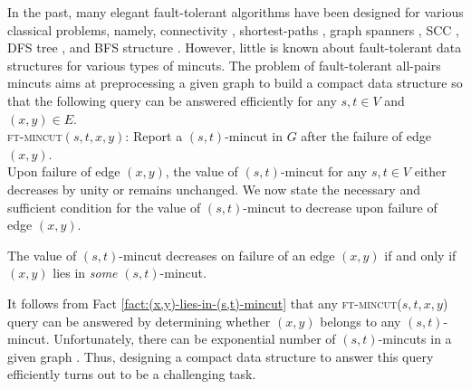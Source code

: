 In the past, many elegant fault-tolerant algorithms have been designed for various classical problems, namely,  connectivity \cite{DBLP:conf/stoc/Chan02,DBLP:journals/algorithmica/FrigioniI00,DBLP:journals/siamcomp/ChanPR11,DBLP:conf/soda/DuanP17}, shortest-paths \cite{DBLP:conf/stoc/BernsteinK09,DBLP:journals/siamcomp/DemetrescuTCR08,DBLP:conf/stoc/ChechikC20}, graph spanners \cite{ChechikLPR10,DBLP:journals/tcs/BraunschvigCPS15}, SCC \cite{DBLP:journals/algorithmica/BaswanaCR19} , DFS tree \cite{DBLP:journals/siamcomp/BaswanaCC019}, and BFS structure \cite{DBLP:journals/talg/ParterP16,DBLP:journals/talg/ParterP18}. However, little is known about fault-tolerant data structures for various types of mincuts. The problem of fault-tolerant all-pairs mincuts aims at preprocessing a given graph to build a compact data structure so that the following query can be answered efficiently for any $s,t\in V$ and $(x,y)\in E$.\\


\noindent
{\textsc{ft-mincut}}$(s,t,x,y)$: Report a $(s,t)$-mincut in $G$ after the failure of edge $(x,y)$.\\


Upon failure of edge $(x,y)$, the value of $(s,t)$-mincut for any $s,t\in V$ either decreases by unity or remains unchanged. We now state the necessary and sufficient condition for the value of $(s,t)$-mincut to decrease upon failure of edge $(x,y)$.

\begin{fact}
\label{fact:(x,y)-lies-in-(s,t)-mincut}
The value of $(s,t)$-mincut decreases on failure of an edge $(x,y)$ if and only if $(x,y)$ lies in \textit{some} $(s,t)$-mincut.
\end{fact}

It follows from Fact \ref{fact:(x,y)-lies-in-(s,t)-mincut} that any {\textsc{ft-mincut}}($s,t,x,y$) query can be answered by determining whether $(x,y)$ belongs to any $(s,t)$-mincut. Unfortunately, there can be exponential number of $(s,t)$-mincuts in a given graph \cite{DBLP:journals/mp/PicardQ82}. Thus, designing a compact data structure to answer this query efficiently turns out to be a challenging task.

